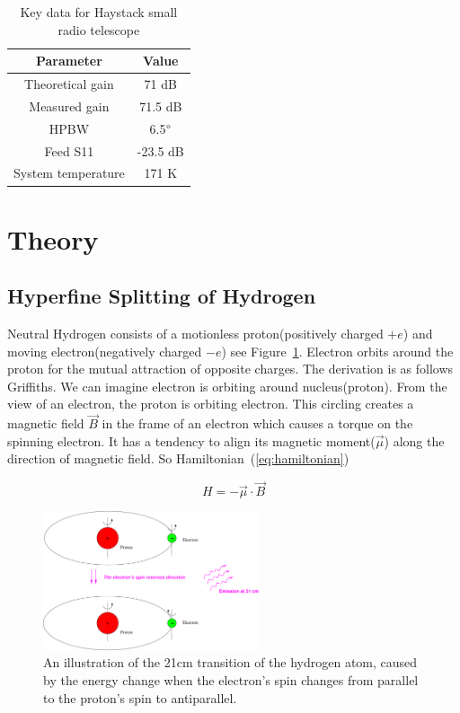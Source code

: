 \documentclass[conference]{IEEEtran}
\begin{document}
\begin{table}[htbp]
\caption{Key data for Haystack small radio telescope}
\begin{center}
\begin{tabular}{|c|c|}
\hline
\textbf{Parameter}&\multicolumn{1}{|c|}{\textbf{Value}} \\
\cline{1-2} 
\hline
Theoretical gain & 71 dB\\
\hline
Measured gain & 71.5 dB\\
\hline
HPBW & 6.5$\degree$\\
\hline
Feed S11 & -23.5 dB\\
\hline
System temperature & 171 K\\
\hline
\end{tabular}
\label{Tab:block_summerize}
\end{center}
\end{table}

\section{Theory}

\subsection{Hyperfine Splitting of Hydrogen}

Neutral Hydrogen consists of a motionless proton(positively charged $+e$) and moving electron(negatively charged $-e$) see Figure~\ref{fig:hyperfine_figure}. Electron orbits around the proton for the mutual attraction of opposite charges. The derivation is as follows Griffiths\cite{griffiths2016introduction}. We can imagine electron is orbiting around nucleus(proton). From the view of an electron, the proton is orbiting electron. This circling creates a magnetic field $\vec{B}$ in the frame of an electron which causes a torque on the spinning electron. It has a tendency to align its magnetic moment($\vec{\mu}$) along the direction of magnetic field\cite{griffiths2016introduction}. So Hamiltonian~(\ref{eq:hamiltonian})

\begin{equation}
  H=-\vec{\mu}\cdot\vec{B}
  \label{eq:hamiltonian} 
\end{equation}

\begin{figure}[htbp]
\centerline{\includegraphics[width=2.5in]{hyperfine.pdf}}
\caption{An illustration of the 21cm transition of the hydrogen atom, caused by the energy change when the electron's spin changes from parallel to the proton's spin to antiparallel\cite{Dante2014}.}
\label{fig:hyperfine_figure}
\end{figure}
\end{document}

